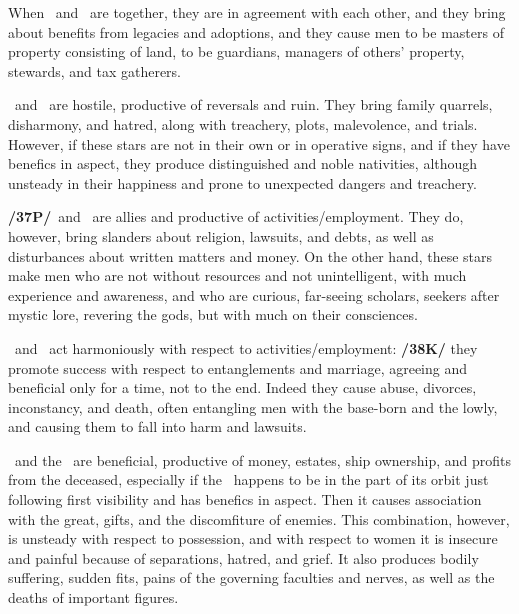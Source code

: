 When \Saturn\, and \Jupiter\, are together, they are in agreement with each other, and they bring about benefits from legacies and adoptions, and they cause men to be masters of property consisting of land, to be guardians, managers of others’ property, stewards, and tax gatherers.

\Saturn\, and \Mars\, are hostile, productive of reversals and ruin. They bring family quarrels, disharmony, and hatred, along with treachery, plots, malevolence, and trials. However, if these stars are not in their own or in operative signs, and if they have benefics in aspect, they produce distinguished and noble nativities, although unsteady in their happiness and prone to unexpected dangers and treachery.

\textbf{/37P/}\Saturn\, and \Mercury\, are allies and productive of activities/employment. They do, however, bring slanders about religion, lawsuits, and debts, as well as disturbances about written matters and money. On the other hand, these stars make men who are not without resources and not unintelligent, with much experience and awareness, and who are curious, far-seeing scholars, seekers after mystic lore, revering the gods, but with much on their consciences.

\Saturn\, and \Venus\, act harmoniously with respect to activities/employment: \textbf{/38K/} they promote success with respect to entanglements and marriage, agreeing and beneficial only for a time, not to the end. Indeed they cause abuse, divorces, inconstancy, and death, often entangling men with the base-born and the lowly, and causing them to fall into harm and lawsuits.

\Saturn\, and the \Moon\, are beneficial, productive of money, estates, ship ownership, and profits from the deceased, \mndl especially if the \Moon\, happens to be in the part of its orbit just following first visibility and has benefics in aspect. Then it causes association with the great, gifts, and the discomfiture of enemies. This combination, however, is unsteady with respect to possession, and with respect to women it is insecure and painful because of separations, hatred, and grief. It also produces bodily suffering, sudden fits, pains of the governing faculties and nerves, as well as the deaths of important figures.

